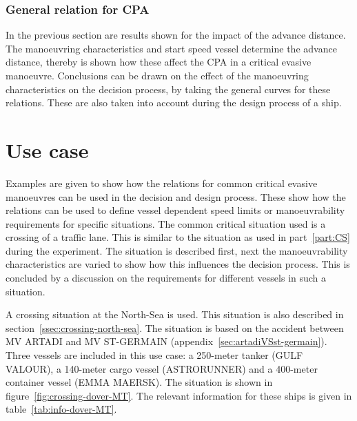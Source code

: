 \subsubsection{General relation for CPA}
In the previous section are results shown for the impact of the advance distance. The manoeuvring characteristics and start speed vessel determine the advance distance, thereby is shown how these affect the CPA in a critical evasive manoeuvre. Conclusions can be drawn on the effect of the manoeuvring characteristics on the decision process, by taking the general curves for these relations. These are also taken into account during the design process of a ship.

\section{Use case}
Examples are given to show how the relations for common critical evasive manoeuvres can be used in the decision and design process. These show how the relations can be used to define vessel dependent speed limits or manoeuvrability requirements for specific situations. The common critical situation used is a crossing of a traffic lane. This is similar to the situation as used in part~\ref{part:CS} during the experiment. The situation is described first, next the manoeuvrability characteristics are varied to show how this influences the decision process. This is concluded by a discussion on the requirements for different vessels in such a situation.

A crossing situation at the North-Sea is used. This situation is also described in section~\ref{ssec:crossing-north-sea}. The situation is based on the accident between MV ARTADI and MV ST-GERMAIN (appendix~\ref{sec:artadiVSst-germain}). Three vessels are included in this use case: a 250-meter tanker (GULF VALOUR), a 140-meter cargo vessel (ASTRORUNNER) and a 400-meter container vessel (EMMA MAERSK). The situation is shown in figure~\ref{fig:crossing-dover-MT}. The relevant information for these ships is given in table~\ref{tab:info-dover-MT}.

